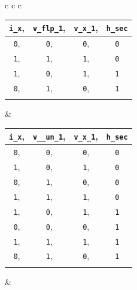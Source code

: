 \documentclass[acmlarge, manuscript, screen, review, anonymous, table]{acmart}
\newcommand{\icONE}[1][cho]{\inlinecode[#1]{1}}
\newcommand{\iczed}[1][cho]{\inlinecode[#1]{0}}
\newcommand{\inlinecode}[2][cho]{\lstinline[language=#1]{#2}}
\begin{document}
\begin{figure}[tbhp]
  \centering
    \begin{tabular}{c c c}\hspace{-7pt}
    \begin{tabular}[b]{| >{\columncolor{ideal}}c >{\columncolor{real}}c >{\columncolor{real}}c >{\columncolor{secret}}c |}
    \hline
        \inlinecode{i_x},& \inlinecode{v_flp_1},& \inlinecode{v_x_1},& \inlinecode{h_sec} \\
    \hline
        \iczed,&           \iczed,&               \iczed,&             \iczed\\
        \icONE,&           \icONE,&               \icONE,&             \iczed\\
        \icONE,&           \iczed,&               \icONE,&             \icONE\\
        \iczed,&           \icONE,&               \iczed,&             \icONE\\
    \hline
        \multicolumn{4}{c}{\textit{(a.)} Protocol~\ref{fig:example-insecure}}
    \end{tabular}
    &
    \begin{tabular}[b]{| >{\columncolor{ideal}}c >{\columncolor{real}}c >{\columncolor{real}}c >{\columncolor{secret}}c |}
    \hline
        \inlinecode{i_x},& \inlinecode{v__un_1},& \inlinecode{v_x_1},& \inlinecode{h_sec} \\
    \hline
        \iczed,&           \iczed,&           \iczed,&           \iczed\\
        \icONE,&           \iczed,&           \icONE,&           \iczed\\
        \iczed,&           \icONE,&           \iczed,&           \iczed\\
        \icONE,&           \icONE,&           \icONE,&           \iczed\\
        \icONE,&           \iczed,&           \icONE,&           \icONE\\
        \iczed,&           \iczed,&           \iczed,&           \icONE\\
        \icONE,&           \icONE,&           \icONE,&           \icONE\\
        \iczed,&           \icONE,&           \iczed,&           \icONE\\
    \hline
        \multicolumn{4}{c}{\textit{(b.)} Protocol~\ref{fig:example-vac-protocol}}
    \end{tabular}
    &
    \begin{tabular}[b]{| >{\columncolor{ideal}}c >{\columncolor{ideal}}c >{\columncolor{real}}c >{\columncolor{secret}}c |}

\end{tabular}
\end{tabular}
\end{figure}
\end{document}
